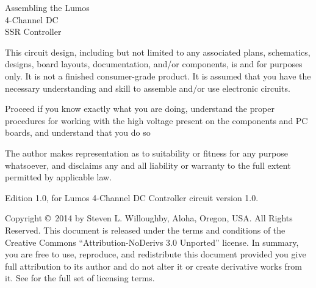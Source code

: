 \documentclass[letterpaper,twoside,onecolumn,openright,final]{memoir}
\begin{document}
\frontmatter

\thispagestyle{empty}
\vfill
\begin{center}
{\fontsize{48}{50}\selectfont
Assembling the Lumos\TM\\4-Channel DC\\SSR Controller\\\strut

\vfill
}

\end{center}

\newpage
\begin{center}


\end{center}

This circuit design, including but not limited to any associated plans, schematics, designs, board layouts, documentation, 
and/or components, is  and for  purposes only. It is not a finished consumer-grade product.
It is assumed that you have the necessary understanding and skill to assemble and/or use electronic circuits.

Proceed  if you know exactly what you are doing, understand the proper procedures for working with the high voltage present on the components and PC boards, and understand that you do so 

The author makes  representation as to suitability or fitness for any purpose whatsoever, and disclaims any and all liability or warranty to the full extent permitted by applicable law.

\strut\vfill
\noindent Edition 1.0, for Lumos 4-Channel DC Controller circuit version 1.0.

\smallskip


\noindent Copyright \copyright\ 2014 by Steven L. Willoughby,
Aloha, Oregon, USA.  All Rights Reserved.  
This document is released under the terms and conditions of the 
Creative Commons ``Attribution-NoDerivs 3.0 Unported'' license.  
In summary, you are free to use, reproduce, and redistribute this 
document provided you give full attribution to its author and do not
alter it or create derivative works from it.  See
 for the full
set of licensing terms.
\end{document}
